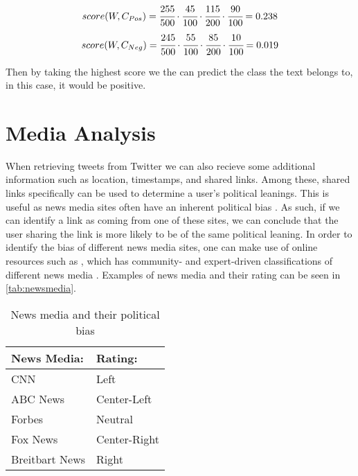 \begin{equation}\label{e:Pos}
score(W, C_{Pos}) = \cfrac{255}{500} \cdot \cfrac{45}{100} \cdot
\cfrac{115}{200} \cdot \cfrac{90}{100} = 0.238
\end{equation}
\begin{equation}\label{e:Neg}
score(W, C_{Neg}) = \cfrac{245}{500} \cdot \cfrac{55}{100} \cdot \cfrac{85}{200}
\cdot \cfrac{10}{100} = 0.019
\end{equation}

Then by taking the highest score we the can predict the class the text belongs
to, in this case, it would be positive.

\section{Media Analysis}\label{sec:mediaAnalysis}
When retrieving tweets from Twitter we can also recieve some additional
information such as location, timestamps, and shared links. Among these, shared
links specifically can be used to determine a user's political leanings. This is
useful as news media sites often have an inherent political bias
\citep{allSides}. As such, if we can identify a link as coming from one of
these sites, we can conclude that the user sharing the link is more likely to be
of the same political leaning. In order to identify the bias of different news
media sites, one can make use of online resources such as ,
which has community- and expert-driven classifications of different news
media \citep{allSidesBias}. Examples of news media and their rating can be seen
in \autoref{tab:newsmedia}.

\begin{table}[H]\centering
\begin{tabular}{|l|l|}\hline
\textbf{News Media:} & \textbf{Rating:}	\\\hline
CNN				&	Left		\\\hline
ABC News		&	Center-Left	\\\hline
Forbes			&	Neutral		\\\hline
Fox News		&	Center-Right\\\hline
Breitbart News	&	Right		\\\hline
\end{tabular}
\caption{News media and their political bias}
\label{tab:newsmedia}
\end{table}

